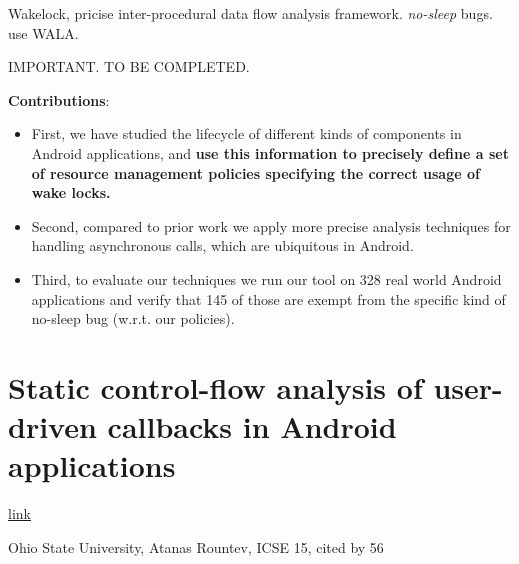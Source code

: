 \documentclass{article}
\begin{document}
Wakelock, pricise inter-procedural data flow analysis framework. \emph{no-sleep}
bugs. use WALA.

IMPORTANT. TO BE COMPLETED.


\textbf{Contributions}:
\begin{itemize}
\item First, we have studied the lifecycle of different kinds of components in
  Android applications, and \textbf{use this information to precisely define a
    set of resource management policies specifying the correct usage of wake
    locks.}
\item Second, compared to prior work we apply more precise analysis techniques
  for handling asynchronous calls, which are ubiquitous in Android.
\item Third, to evaluate our techniques we run our tool on 328 real world
  Android applications and verify that 145 of those are exempt from the specific
  kind of no-sleep bug (w.r.t. our policies).
\end{itemize}


\section{Static control-flow analysis of user-driven callbacks in Android
  applications}

\href{http://dl.acm.org/citation.cfm?id=2818768}{link}

Ohio State University, Atanas Rountev, ICSE 15, cited by 56
\end{document}

